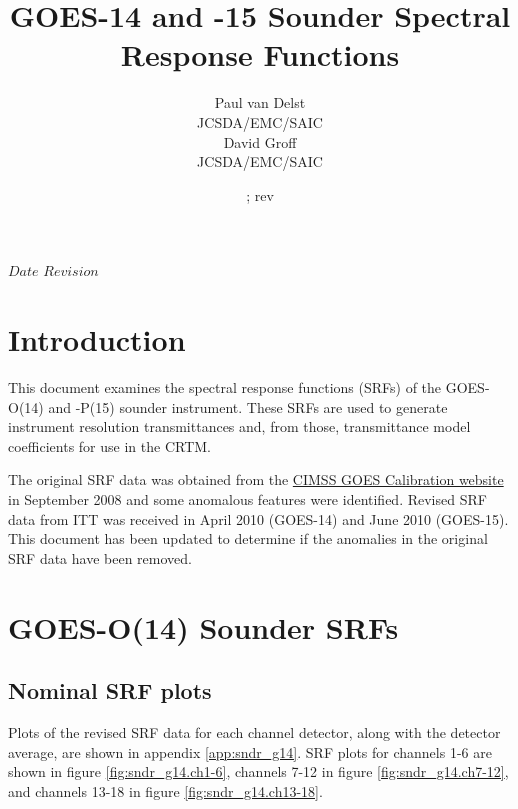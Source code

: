 



\SVN $Date$
\SVN $Revision$

\title{GOES-14 and -15 Sounder Spectral Response Functions}
\author{Paul van Delst\\JCSDA/EMC/SAIC\\[0.25in]
        David Groff\\JCSDA/EMC/SAIC}
\date{\SVNDate ; rev\SVNRevision}
\docnumber{ }



\maketitle


\setcounter{page}{1}

\section{Introduction}
This document examines the spectral response functions (SRFs) of the GOES-O(14) and -P(15) sounder instrument. These SRFs are used to generate instrument resolution transmittances and, from those, transmittance model coefficients for use in the CRTM.

The original SRF data was obtained from the \href{http://cimss.ssec.wisc.edu/goes/calibration/SRF}{CIMSS GOES Calibration website} in September 2008 and some anomalous features were identified. Revised SRF data from ITT was received in April 2010 (GOES-14) and June 2010 (GOES-15). This document has been updated to determine if the anomalies in the original SRF data have been removed.


\clearpage
\section{GOES-O(14) Sounder SRFs}

\subsection{Nominal SRF plots}
Plots of the revised SRF data for each channel detector, along with the detector average, are shown in appendix \ref{app:sndr_g14}. SRF plots for channels 1-6 are shown in figure \ref{fig:sndr_g14.ch1-6}, channels 7-12 in figure \ref{fig:sndr_g14.ch7-12}, and channels 13-18 in figure \ref{fig:sndr_g14.ch13-18}.


